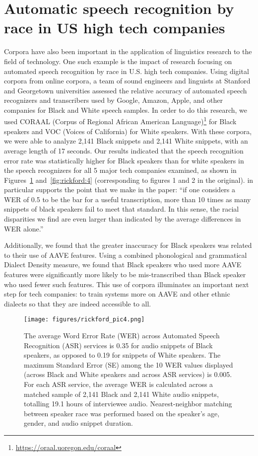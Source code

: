 \documentclass[output=paper,colorlinks,citecolor=brown]{langscibook}
\begin{document}
\section{Automatic speech recognition by race in US high tech companies}

Corpora have also been important in the application of linguistics research to the field of technology. One such example is the impact of research focusing on automated speech recognition by race in U.S. high tech companies. Using digital corpora from online corpora, a team of sound engineers and linguists at Stanford and Georgetown universities \citep{KoeneckeGoel2020} assessed the relative accuracy of automated speech recognizers and transcribers used by Google, Amazon, Apple, and other companies for Black and White speech samples. In order to do this research, we used CORAAL (Corpus of Regional African American Language)\footnote{\url{https://oraal.uoregon.edu/coraal}} for Black speakers and VOC (Voices of California) for White speakers. With these corpora, we were able to analyze 2,141 Black snippets and 2,141 White snippets, with an average length of 17 seconds.  Our results indicated that the speech recognition error rate was statistically higher for Black speakers than for white speakers in the speech recognizers for all 5 major tech companies examined, as shown in Figures~\ref{fig:rickford:3} and~\ref{fig:rickford:4} (corresponding to figures 1 and 2 in the original).   in particular supports the point that we make in the paper:  “if one considers a WER of 0.5 to be the bar for a useful transcription, more than 10 times as many snippets of black speakers fail to meet that standard.  In this sense, the racial disparities we find are even larger than indicated by the average differences in WER alone.”

Additionally, we found that the greater inaccuracy for Black speakers was related to their use of AAVE features. Using a combined phonological and grammatical Dialect Density measure, we found that Black speakers who used more AAVE features were significantly more likely to be mis-transcribed than Black speaker who used fewer such features. This use of corpora illuminates an important next step for tech companies: to train systems more on AAVE and other ethnic dialects so that they are indeed accessible to all.

  
\begin{figure}
\texttt{[image: figures/rickford\_pic4.png]}
\caption{The  average Word Error Rate (WER) across Automated Speech Recognition (ASR) services is 0.35 for audio snippets of Black speakers, as opposed to 0.19 for snippets of White speakers.  The maximum Standard Error (SE) among the 10 WER values displayed (across Black and White speakers and across ASR services) is 0.005.  For each ASR service, the average WER is calculated across a matched sample of 2,141 Black and 2,141 White audio snippets, totalling 19.1 hours of interviewee audio.  Nearest-neighbor matching between speaker race was performed based on the speaker’s age, gender, and audio snippet duration.}
\label{fig:rickford:3}
\end{figure}
\end{document}
